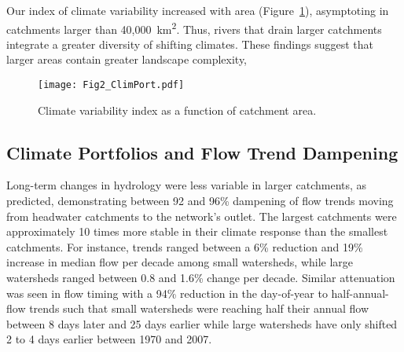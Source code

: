 \documentclass{AGUJournal}
\begin{document}
Our index of climate variability increased with area (Figure~\ref{fig:2}), asymptoting in catchments larger than 40,000~km\textsuperscript{2}. Thus, rivers that drain larger catchments integrate a greater diversity of shifting climates. These findings suggest that larger areas contain greater landscape complexity, 

\begin{figure}[h]
\centering
\texttt{[image: Fig2\_ClimPort.pdf]}
	\caption{Climate variability index as a function of catchment area. } 
\label{fig:2}
\end{figure}

\subsection{Climate Portfolios and Flow Trend Dampening}

Long-term changes in hydrology were less variable in larger catchments, as predicted, demonstrating between 92 and 96\% dampening of flow trends moving from headwater catchments to the network's outlet. The largest catchments were approximately 10 times more stable in their climate response than the smallest catchments. For instance, trends ranged between a 6\% reduction and 19\% increase in median flow per decade among small watersheds, while large watersheds ranged between 0.8 and 1.6\% change per decade. Similar attenuation was seen in flow timing with a 94\% reduction in the day-of-year to half-annual-flow trends such that small watersheds were reaching half their annual flow between 8 days later and 25 days earlier while large watersheds have only shifted 2 to 4 days earlier between 1970 and 2007.
\end{document}
